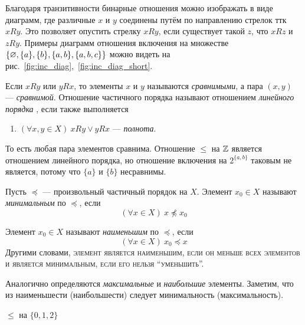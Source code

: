 Благодаря транзитивности бинарные отношения можно изображать в виде диаграмм, где
различные $x$ и $y$ соединены путём по направлению стрелок ттк $xRy$.
Это позволяет опустить стрелку $xRy$, если существует такой $z$, что $xRz$ и $zRy$.
Примеры диаграмм отношения включения на множестве
$\{\varnothing,\{a\},\{b\},\{a,b\}, \{a,b,c\}\}$
можно видеть на рис.~\ref{fig:inc_diag},~\ref{fig:inc_diag_short}.

Если $xRy$ или $yRx$, то элементы $x$ и $y$ называются
{\it сравнимыми},
а пара $(x,y)$ --- {\it сравнимой}.
Отношение частичного порядка называют отношением {\it линейного порядка}
, если также выполняется
\begin{enumerate}[resume*]
  \item{}$(\forall x,y\in X)~xRy\lor yRx$ --- {\it полнота}.
\end{enumerate}
То есть любая пара элементов сравнима. Отношение $\leq$ на $\mathbb Z$
является отношением линейного порядка,
но отношение включения на $2^{\{a,b\}}$ таковым не является,
потому что $\{a\}$ и $\{b\}$ несравнимы.

Пусть $\preceq$ --- произвольный частичный порядок на $X$.
Элемент $x_0\in X$ называют {\it минимальным}
по $\preceq$, если
\[
  (\forall x\in X)~x\npreceq x_0
\]

Элемент $x_0\in X$ называют {\it наименьшим}
 по $\preceq$, если
\[
  (\forall x\in X)~x_0\preceq x
\]
Другими словами, \textsc{элемент является наименьшим,
  если он меньше всех элементов и является минимальным, если его нельзя
  ``уменьшить''.}

Аналогично определяются {\it максимальные} и {\it наибольшие} элементы.
Заметим, что из наименьшести (наибольшести) следует минимальность (максимальность).

\begin{marginfigure}
  \center

  \caption{$\leq$ на $\{0,1,2\}$}\label{fig:less_higher}
\end{marginfigure}

